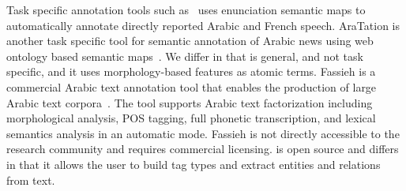 Task specific annotation tools such as~\cite{alrahabi2006semantic}
uses enunciation semantic maps to automatically annotate 
directly reported Arabic and French speech. 
AraTation is another task specific tool for semantic annotation of 
Arabic news using web ontology based semantic maps~\cite{saleh2009aratation}.
We differ in that \framework is general, and not task specific, and it uses 
morphology-based features as atomic terms.
Fassieh is a commercial Arabic text annotation tool that enables the production of large 
Arabic text corpora~\cite{attia2009fassieh}. 
The tool supports Arabic text factorization including morphological analysis, POS tagging, 
full phonetic transcription, and lexical semantics analysis in an automatic mode. 
Fassieh is not directly accessible to the research community and requires commercial licensing. 
\framework is open source and differs in that it allows the user to build tag types 
and extract entities and relations from text.